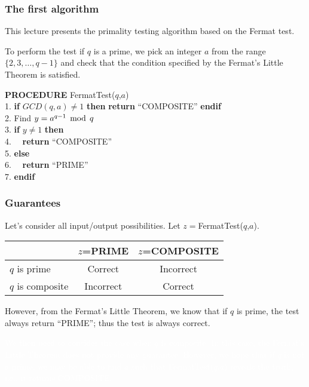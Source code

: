 

\begin{frame}\frametitle{The first algorithm}
  This lecture presents the primality testing algorithm based on the
  Fermat test.

  To perform the test if $q$ is a prime, we pick an integer $a$ from
  the range $\{2,3,\ldots,q-1\}$ and check that the condition
  specified by the Fermat's Little Theorem is satisfied.
  \begin{tcolorbox}
    {\bf PROCEDURE} FermatTest($q$,$a$)\\
    1. {\bf if} $GCD(q,a)\neq 1$ {\bf then} {\bf return} ``COMPOSITE'' {\bf endif}\\
    2. Find $y = a^{q-1}\,\bmod\, q$\\
    3. {\bf if} $y\neq 1$ {\bf then}\\
    4. \ \ {\bf return} ``COMPOSITE''\\
    5. {\bf else}\\
    6. \ \ {\bf return} ``PRIME''\\
    7. {\bf endif}
  \end{tcolorbox}
\end{frame}

\begin{frame}\frametitle{Guarantees}
  Let's consider all input/output possibilities.  Let
  $z=$FermatTest($q$,$a$).

  \vspace{0.1in}
  \begin{tabular}{|l|c|c|}
    \hline
    & $z$=PRIME & $z$=COMPOSITE \\
    \hline
    $q$ is prime & \pause Correct & \pause Incorrect \\
    \hline
    $q$ is composite & \pause Incorrect & \pause Correct \\
    \hline
  \end{tabular}

  \vspace{0.2in} \pause However, from the Fermat's Little Theorem, we
  know that if $q$ is prime, the test always return ``PRIME''; thus
  the test is always correct.

  \textcolor{white}{We then need to consider the case when $q$ is composite.  In
  this case, the Fermat's Little Theorem does not provide any
  guarantee.  However, we hope that if $q$ is not a prime, we may be
  able to find $a$ such that FermatTest($q$,$a$) reveals the truth,
  i.e., it returns COMPOSITE.}
\end{frame}

